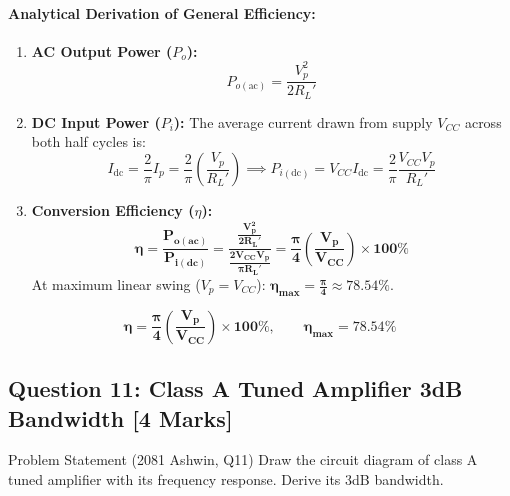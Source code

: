 \documentclass[11pt,a4paper,oneside]{book}
\begin{document}
\paragraph{Analytical Derivation of General Efficiency:}
\begin{enumerate}[leftmargin=1.5em]
  \item \textbf{AC Output Power ($P_o$):}
  \[
  P_{o(\text{ac})} = \frac{V_p^2}{2 R_L'}
  \]
  \item \textbf{DC Input Power ($P_i$):} The average current drawn from supply $V_{CC}$ across both half cycles is:
  \[
  I_{\text{dc}} = \frac{2}{\pi} I_p = \frac{2}{\pi} \left(\frac{V_p}{R_L'}\right) \implies P_{i(\text{dc})} = V_{CC} I_{\text{dc}} = \frac{2}{\pi} \frac{V_{CC} V_p}{R_L'}
  \]
  \item \textbf{Conversion Efficiency ($\eta$):}
  \[
  \mathbf{\eta = \frac{P_{o(\text{ac})}}{P_{i(\text{dc})}} = \frac{\frac{V_p^2}{2 R_L'}}{\frac{2 V_{CC} V_p}{\pi R_L'}} = \frac{\pi}{4} \left(\frac{V_p}{V_{CC}}\right) \times 100\%}
  \]
  At maximum linear swing ($V_p = V_{CC}$): $\mathbf{\eta_{\max} = \frac{\pi}{4} \approx 78.54\%}$.
\end{enumerate}

\begin{answerbox}
$$\mathbf{\eta = \frac{\pi}{4} \left(\frac{V_p}{V_{CC}}\right) \times 100\%, \qquad \eta_{\max} = 78.54\%}$$
\end{answerbox}

\vspace{0.6cm}

\subsection{Question 11: Class A Tuned Amplifier 3dB Bandwidth [4 Marks]}
\begin{questionbox}{Problem Statement (2081 Ashwin, Q11)}
Draw the circuit diagram of class A tuned amplifier with its frequency response. Derive its 3dB bandwidth.
\end{questionbox}
\end{document}
